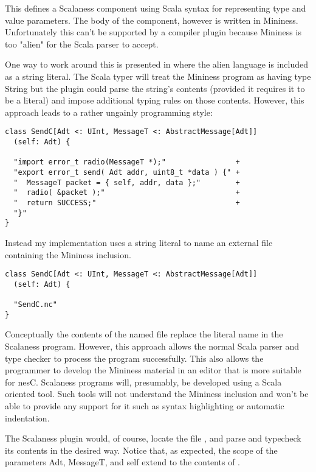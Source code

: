 This defines a Scalaness component using Scala syntax for representing type and value
parameters. The body of the component, however is written in Mininess. Unfortunately this can't
be supported by a compiler plugin because Mininess is too "alien" for the Scala parser to
accept.

One way to work around this is presented in \cite{Garcia-Scala-Query} where the alien language
is included as a string literal. The Scala typer will treat the Mininess program as having type
String but the plugin could parse the string's contents (provided it requires it to be a
literal) and impose additional typing rules on those contents. However, this approach leads to a
rather ungainly programming style:

\singlespace
\begin{lstlisting}[language=scalaness]
class SendC[Adt <: UInt, MessageT <: AbstractMessage[Adt]]
  (self: Adt) {

  "import error_t radio(MessageT *);"                +
  "export error_t send( Adt addr, uint8_t *data ) {" +
  "  MessageT packet = { self, addr, data };"        +
  "  radio( &packet );"                              +
  "  return SUCCESS;"                                +
  "}"
}
\end{lstlisting}
\primaryspacing

Instead my implementation uses a string literal to name an external file containing the Mininess
inclusion.

\singlespace
\begin{lstlisting}[language=scalaness]
class SendC[Adt <: UInt, MessageT <: AbstractMessage[Adt]]
  (self: Adt) {

  "SendC.nc"
}
\end{lstlisting}
\primaryspacing

Conceptually the contents of the named file replace the literal name in the Scalaness program.
However, this approach allows the normal Scala parser and type checker to process the program
successfully. This also allows the programmer to develop the Mininess material in an editor that
is more suitable for nesC. Scalaness programs will, presumably, be developed using a Scala
oriented tool. Such tools will not understand the Mininess inclusion and won't be able to
provide any support for it such as syntax highlighting or automatic indentation.

The Scalaness plugin would, of course, locate the file , and parse and
typecheck its contents in the desired way. Notice that, as expected, the scope of the parameters
Adt, MessageT, and self extend to the contents of .



